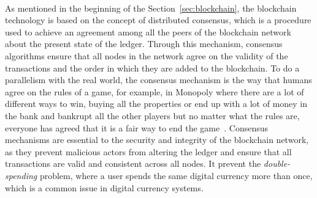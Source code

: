 \paragraph{}

As mentioned in the beginning of the Section~\ref{sec:blockchain}, the blockchain technology is based on the concept of distributed consensus, which is a procedure used to achieve an
agreement among all the peers of the blockchain network about the present state of the ledger. Through this mechanism, consensus algorithms ensure that all nodes in the network agree on the validity of the transactions and the order in which they are added to the blockchain.
To do a parallelism with the real world, the consensus mechanism is the way that humans agree on the rules of a game, for example, in Monopoly where there are a lot of different ways to win, buying all the properties or end up with a lot of money in the bank
and bankrupt all the other players but no matter what the rules are, everyone has agreed that it is a fair way to end the game~\cite{whatIsConsensus}.
Consensus mechanisms are essential to the security and integrity of the blockchain network, as they prevent malicious actors from altering the ledger and ensure that all transactions are valid and consistent across all nodes.
It prevent the \textit{double-spending} problem, where a user spends the same digital currency more than once, which is a common issue in digital currency systems.

